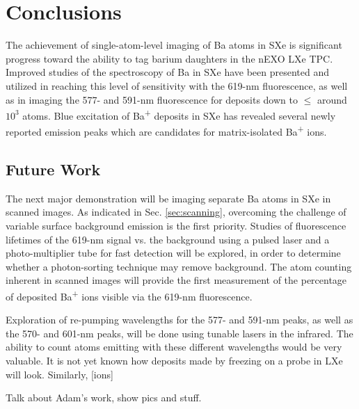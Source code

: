 \chapter{Conclusions}

The achievement of single-atom-level imaging of Ba atoms in SXe is significant progress toward the ability to tag barium daughters in the nEXO LXe TPC.  Improved studies of the spectroscopy of Ba in SXe have been presented and utilized in reaching this level of sensitivity with the 619-nm fluorescence, as well as in imaging the 577- and 591-nm fluorescence for deposits down to $\leq$ around $10^{3}$ atoms.  Blue excitation of Ba\textsuperscript{+} deposits in SXe has revealed several newly reported emission peaks which are candidates for matrix-isolated Ba\textsuperscript{+} ions.



\section{Future Work}
\label{sec:future}

The next major demonstration will be imaging separate Ba atoms in SXe in scanned images.  As indicated in Sec. \ref{sec:scanning}, overcoming the challenge of variable surface background emission is the first priority.  Studies of fluorescence lifetimes of the 619-nm signal vs. the background using a pulsed laser and a photo-multiplier tube for fast detection will be explored, in order to determine whether a photon-sorting technique may remove background.  The atom counting inherent in scanned images will provide the first measurement of the percentage of deposited Ba\textsuperscript{+} ions visible via the 619-nm fluorescence.

Exploration of re-pumping wavelengths for the 577- and 591-nm peaks, as well as the 570- and 601-nm peaks, will be done using tunable lasers in the infrared.  The ability to count atoms emitting with these different wavelengths would be very valuable.  It is not yet known how deposits made by freezing on a probe in LXe will look.  Similarly, [ions]

Talk about Adam's work, show pics and stuff.